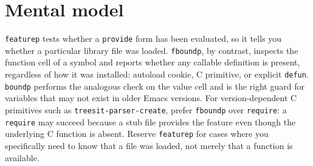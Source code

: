 \section{Mental model}
\texttt{featurep} tests whether a \texttt{provide} form has been evaluated,
so it tells you whether a particular library file was loaded.
\texttt{fboundp}, by contrast, inspects the function cell of a symbol and
reports whether any callable definition is present, regardless of how it was
installed: autoload cookie, C primitive, or explicit \texttt{defun}.
\texttt{boundp} performs the analogous check on the value cell and is the
right guard for variables that may not exist in older Emacs versions.  For
version-dependent C primitives such as \texttt{treesit-parser-create},
prefer \texttt{fboundp} over \texttt{require}: a \texttt{require} may
succeed because a stub file provides the feature even though the underlying C
function is absent.  Reserve \texttt{featurep} for cases where you
specifically need to know that a file was loaded, not merely that a function
is available.

